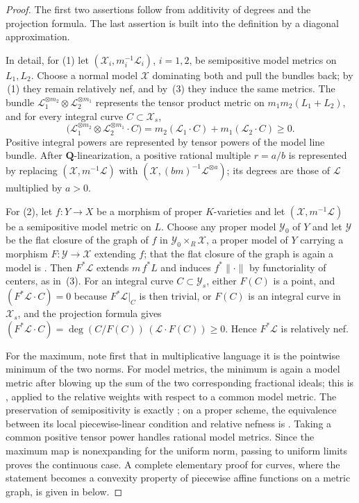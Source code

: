 \begin{proof}
The first two assertions follow from additivity of degrees and the projection
formula. The last assertion is built into the definition by a diagonal
approximation.

In detail, for (1) let $(\mathcal X_i,m_i^{-1}\mathcal L_i)$, $i=1,2$,
be semipositive model metrics on $L_1,L_2$. Choose a normal model
$\mathcal X$ dominating both and pull the bundles back; by
\,(1) they remain relatively nef, and by
\,(3) they induce the same metrics. The
bundle $\mathcal L_1^{\otimes m_2}\otimes\mathcal L_2^{\otimes m_1}$
represents the tensor product metric on $m_1m_2(L_1+L_2)$, and for every
integral curve $C\subset\mathcal X_s$,
\[
 \bigl(\mathcal L_1^{\otimes m_2}\otimes\mathcal L_2^{\otimes m_1}\cdot C\bigr)
 =m_2(\mathcal L_1\cdot C)+m_1(\mathcal L_2\cdot C)\ge0 .
\]
Positive integral powers are represented by tensor powers of the model line
bundle. After $\mathbf Q$-linearization, a positive rational multiple
$r=a/b$ is represented by replacing
$(\mathcal X,m^{-1}\mathcal L)$ with $(\mathcal X,(bm)^{-1}
\mathcal L^{\otimes a})$; its degrees are those of $\mathcal L$
multiplied by $a>0$.

For (2), let $f:Y\to X$ be a morphism of proper $K$-varieties and let
$(\mathcal X,m^{-1}\mathcal L)$ be a semipositive model metric on $L$.
Choose any proper model $\mathcal Y_0$ of $Y$ and let $\mathcal Y$ be
the flat closure of the graph of $f$ in
$\mathcal Y_0\times_R\mathcal X$, a proper model of $Y$ carrying a
morphism $F:\mathcal Y\to\mathcal X$ extending $f$; that the flat
closure of the graph is again a model is
. Then
$F^*\mathcal L$ extends $m\,f^*L$ and induces $f^*\|\cdot\|$ by
functoriality of centers, as in
\,(3). For an integral curve
$C\subset\mathcal Y_s$, either $F(C)$ is a point, and
$(F^*\mathcal L\cdot C)=0$ because $F^*\mathcal L|_C$ is then trivial,
or $F(C)$ is an integral curve in $\mathcal X_s$, and the projection
formula gives
$(F^*\mathcal L\cdot C)=\deg(C/F(C))\,(\mathcal L\cdot F(C))\ge0$. Hence
$F^*\mathcal L$ is relatively nef.

For the maximum, note first that in multiplicative language it is the
pointwise minimum of the two norms. For model metrics, the minimum is again
a model metric after blowing up the sum of the two corresponding fractional
ideals; this is , applied to the relative
weights with respect to a common model metric. The preservation of
semipositivity is exactly \cite[Proposition~3.12]{GM19}; on a proper scheme,
the equivalence between its local piecewise-linear condition and relative
nefness is \cite[Theorem~1.1]{GM19}. Taking a common positive tensor power
handles rational model metrics. Since the maximum map is nonexpanding for
the uniform norm, passing to uniform limits proves the continuous case. A
complete elementary proof for curves, where the statement becomes a
convexity property of piecewise affine functions on a metric graph, is given
in  below.


\end{proof}
